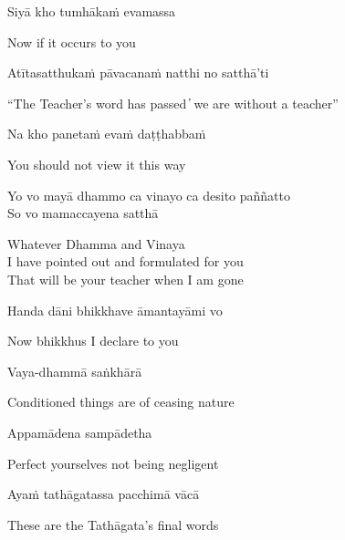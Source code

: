 \begin{leader}
\end{leader}

Siyā kho tumhākaṁ evamassa

\begin{cprenglish}
  Now if it occurs to you
\end{cprenglish}

Atītasatthukaṁ pāvacanaṁ natthi no satthā’ti

\begin{cprenglish}
  “The Teacher’s word has passed  ̓  we are without a teacher”
\end{cprenglish}

Na kho panetaṁ evaṁ daṭṭhabbaṁ

\begin{cprenglish}
  You should not view it this way
\end{cprenglish}

Yo vo mayā dhammo ca vinayo ca desito paññatto\\
So vo mamaccayena satthā

\begin{cprenglish}
  Whatever Dhamma and Vinaya\\
  I have pointed out and formulated for you\\
  That will be your teacher when I am gone
\end{cprenglish}

Handa dāni bhikkhave āmantayāmi vo

\begin{cprenglish}
  Now bhikkhus I declare to you
\end{cprenglish}

Vaya-dhammā saṅkhārā

\begin{cprenglish}
  Conditioned things are of ceasing nature
\end{cprenglish}

Appamādena sampādetha

\begin{cprenglish}
  Perfect yourselves not being negligent
\end{cprenglish}

Ayaṁ tathāgatassa pacchimā vācā

\begin{cprenglish}
  These are the Tathāgata’s final words
\end{cprenglish}

\suttaRef{[DN 16]}

\clearpage
